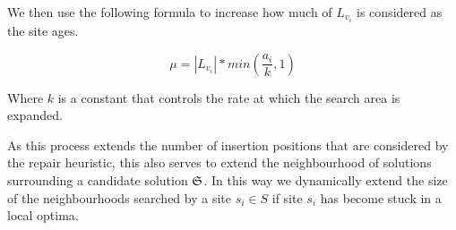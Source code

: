
We then use the following formula to increase how much of $L_{v_i}$ is considered as the site ages.

\[
   \mu = |L_{v_i}| * min(\frac{a_i}{k}, 1)
\]

Where $k$ is a constant that controls the rate at which the search area is expanded. 

As this process extends the number of insertion positions that are considered by the repair heuristic, this also serves to extend the neighbourhood of solutions surrounding a candidate solution $\mathfrak{S}$. In this way we dynamically extend the size of the neighbourhoods searched by a site $s_i \in S$ if site $s_i$ has become stuck in a local optima.






